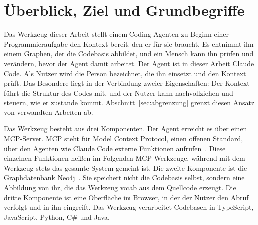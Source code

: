 \section{Überblick, Ziel und Grundbegriffe}%
\label{sec:werkzeug-ueberblick}
Das Werkzeug dieser Arbeit stellt einem Coding-Agenten zu Beginn einer Programmieraufgabe den Kontext bereit, den er für sie braucht. Es entnimmt ihn einem Graphen, der die Codebasis abbildet, und ein Mensch kann ihn prüfen und verändern, bevor der Agent damit arbeitet. Der Agent ist in dieser Arbeit Claude Code. Als Nutzer wird die Person bezeichnet, die ihn einsetzt und den Kontext prüft. Das Besondere liegt in der Verbindung zweier Eigenschaften: Der Kontext führt die Struktur des Codes mit, und der Nutzer kann nachvollziehen und steuern, wie er zustande kommt. Abschnitt~\ref{sec:abgrenzung} grenzt diesen Ansatz von verwandten Arbeiten ab.

Das Werkzeug besteht aus drei Komponenten. Der Agent erreicht es über einen MCP-Server. MCP steht für Model Context Protocol, einen offenen Standard, über den Agenten wie Claude Code externe Funktionen aufrufen~\parencite{anthropic2024mcp}. Diese einzelnen Funktionen heißen im Folgenden MCP-Werkzeuge, während mit dem Werkzeug stets das gesamte System gemeint ist. Die zweite Komponente ist die Graphdatenbank Neo4j~\parencite{neo4jdocs}. Sie speichert nicht die Codebasis selbst, sondern eine Abbildung von ihr, die das Werkzeug vorab aus dem Quellcode erzeugt. Die dritte Komponente ist eine Oberfläche im Browser, in der der Nutzer den Abruf verfolgt und in ihn eingreift. Das Werkzeug verarbeitet Codebasen in TypeScript, JavaScript, Python, C\# und Java.

